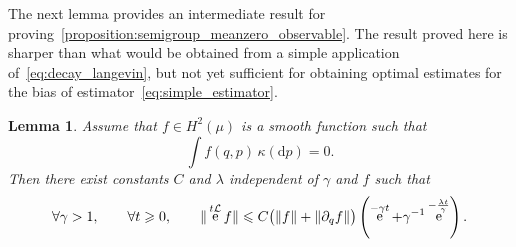 \documentclass[11pt,a4paper]{article}
\DeclareMathOperator{\e}{e}
\renewcommand{\d}{\mathrm d}
\theoremstyle{plain}
\newtheorem{lemma}{Lemma}[section]
\numberwithin{equation}{section}
\renewcommand{\leq}{\leqslant}
\renewcommand{\geq}{\geqslant}
\begin{document}
The next lemma provides an intermediate result for proving~\cref{proposition:semigroup_meanzero_observable}.
The result proved here is sharper than what would be obtained from a simple application of~\eqref{eq:decay_langevin},
but not yet sufficient for obtaining optimal estimates for the bias of estimator~\eqref{eq:simple_estimator}.
\begin{lemma}
    \label{lemma:initial_lemma}
    Assume that $f \in H^2(\mu)$ is a smooth function such that
    \begin{equation}
        \label{eq:assumption_f}
        \int f(q, p) \, \kappa(\d p) = 0.
    \end{equation}
    Then there exist constants $C$ and $\lambda$ independent of $\gamma$ and $f$ such that
    \[
        \forall \gamma > 1, \qquad
        \forall t \geq 0, \qquad
        \norm*{\e^{t\mathcal L} f}
        \leq C \bigl( \norm{f} + \norm{\partial_q f} \bigr)
        \left( \e^{- \gamma t} + \gamma^{-1} \e^{-\frac{\lambda t}{\gamma}} \right).
    \]
\end{lemma}
\end{document}
